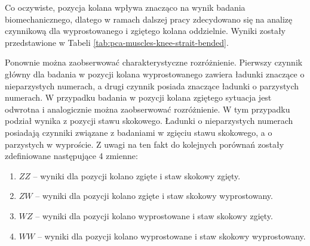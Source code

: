 Co oczywiste, pozycja kolana wpływa znacząco na wynik badania biomechanicznego, dlatego w ramach dalszej pracy zdecydowano się na  analizę czynnikową dla wyprostowanego i zgiętego kolana oddzielnie. Wyniki zostały przedstawione \linebreak w Tabeli \ref{tab:pca-muscles-knee-strait-bended}. 

Ponownie można zaobserwować charakterystyczne rozróżnienie. Pierwszy czynnik główny dla badania w pozycji kolana wyprostowanego zawiera ładunki znaczące o nieparzystych numerach, a drugi czynnik posiada znaczące ładunki o parzystych numerach. W przypadku badania w pozycji kolana zgiętego sytuacja jest odwrotna i analogicznie można zaobserwować rozróżnienie. W tym przypadku podział wynika z pozycji stawu skokowego. Ładunki o nieparzystych numerach posiadają czynniki związane z badaniami w zgięciu stawu skokowego, a o parzystych w wyproście. \linebreak Z uwagi na ten fakt do kolejnych porównań zostały zdefiniowane następujące 4 zmienne:
\begin{enumerate}
	\item $ZZ$ -- wyniki dla pozycji kolano zgięte i staw skokowy zgięty.
	\item $ZW$ -- wyniki dla pozycji kolano zgięte i staw skokowy wyprostowany.
	\item $WZ$ -- wyniki dla pozycji kolano wyprostowane i staw skokowy zgięty.
	\item $WW$ -- wyniki dla pozycji kolano wyprostowane i staw skokowy wyprostowany.
\end{enumerate} 
\vspace{10px}
